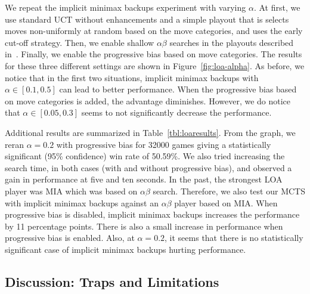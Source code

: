 \documentclass{article}
\begin{document}
We repeat the implicit minimax backups experiment with varying $\alpha$. At first, we use standard UCT without enhancements 
and a simple playout that is selects moves non-uniformly at random based on the move categories, and uses the early cut-off strategy. 
Then, we enable shallow $\alpha \beta$ searches in the playouts described in~\cite{Winands11AB}. 
Finally, we enable the progressive bias based on move categories. The results for these 
three different settings are shown in Figure~\ref{fig:loa-alpha}. As before, we notice that in the first two situations,
implicit minimax backups with $\alpha \in [0.1,0.5]$ can lead to better performance. When the progressive bias based on move 
categories is added, the advantage diminishes. However, we do notice that $\alpha \in [0.05,0.3]$ seems to not significantly 
decrease the performance. 

Additional results are summarized in Table~\ref{tbl:loaresults}. From the graph, we reran $\alpha = 0.2$ with progressive bias for 
32000 games giving a statistically significant (95\% confidence) win rate of 50.59\%. 
We also tried increasing the search time, in both cases (with and without progressive bias), 
and observed a gain in performance at five and ten seconds. 
In the past, the strongest LOA player was MIA which was based on $\alpha \beta$ search. Therefore, we also test our MCTS with 
implicit minimax backups against an $\alpha \beta$ player based on MIA. When progressive bias is disabled, implicit minimax backups
increases the performance by 11 percentage points. There is also a small increase in performance when progressive bias is enabled. 
Also, at $\alpha = 0.2$, it seems that there is no statistically significant case of implicit minimax backups hurting performance. 

\subsection{Discussion: Traps and Limitations} 
\end{document}
